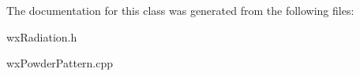 The documentation for this class was generated from the following files\+:\begin{DoxyCompactItemize}
\item 
wx\+Radiation.\+h\item 
wx\+Powder\+Pattern.\+cpp\end{DoxyCompactItemize}
